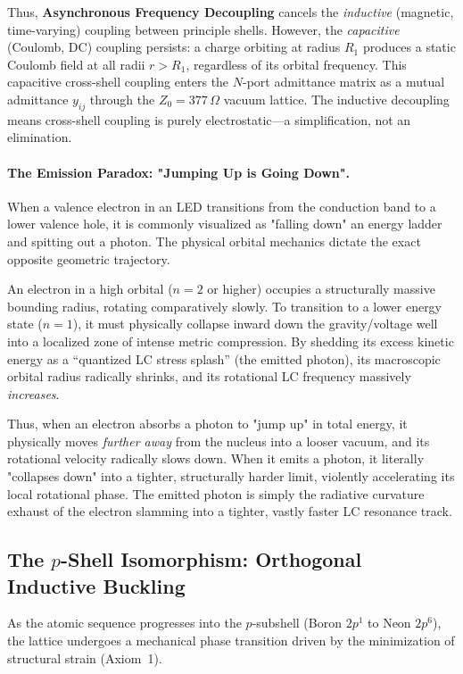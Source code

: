 Thus, \textbf{Asynchronous Frequency Decoupling} cancels the \emph{inductive} (magnetic, time-varying) coupling between principle shells. However, the \emph{capacitive} (Coulomb, DC) coupling persists: a charge orbiting at radius $R_1$ produces a static Coulomb field at all radii $r > R_1$, regardless of its orbital frequency. This capacitive cross-shell coupling enters the $N$-port admittance matrix as a mutual admittance $y_{ij}$ through the $Z_0 = 377\,\Omega$ vacuum lattice. The inductive decoupling means cross-shell coupling is purely electrostatic---a simplification, not an elimination.

\paragraph{The Emission Paradox: "Jumping Up is Going Down".}
When a valence electron in an LED transitions from the conduction band to a lower valence hole, it is commonly visualized as "falling down" an energy ladder and spitting out a photon. The physical orbital mechanics dictate the exact opposite geometric trajectory. 

An electron in a high orbital ($n=2$ or higher) occupies a structurally massive bounding radius, rotating comparatively slowly. To transition to a lower energy state ($n=1$), it must physically collapse inward down the gravity/voltage well into a localized zone of intense metric compression. By shedding its excess kinetic energy as a ``quantized LC stress splash'' (the emitted photon), its macroscopic orbital radius radically shrinks, and its rotational LC frequency massively \textit{increases}. 

Thus, when an electron absorbs a photon to "jump up" in total energy, it physically moves \textit{further away} from the nucleus into a looser vacuum, and its rotational velocity radically slows down. When it emits a photon, it literally "collapses down" into a tighter, structurally harder limit, violently accelerating its local rotational phase. The emitted photon is simply the radiative curvature exhaust of the electron slamming into a tighter, vastly faster LC resonance track.

\subsection{The $p$-Shell Isomorphism: Orthogonal Inductive Buckling}
As the atomic sequence progresses into the $p$-subshell (Boron $2p^1$ to Neon $2p^6$), the lattice undergoes a mechanical phase transition driven by the minimization of structural strain (Axiom~1). 

